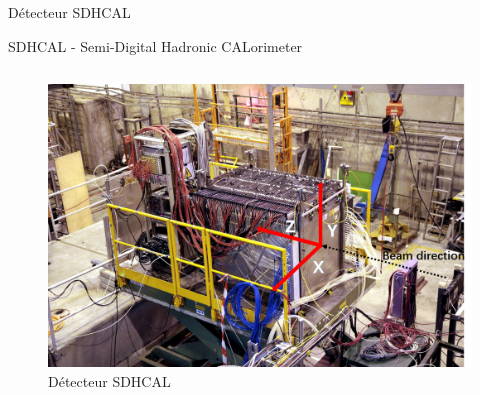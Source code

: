 \documentclass[9pt]{beamer}
\begin{document}
\begin{frame}{Détecteur SDHCAL}
\begin{block}{SDHCAL - Semi-Digital Hadronic CALorimeter}
\begin{columns}
            \begin{column}{0.45\textwidth}
                \begin{figure}
                    \center
                    \includegraphics[width=\textwidth]{../img/SDHCAL.png}
                    \caption{Détecteur SDHCAL}
                    \label{detector}
                \end{figure}
            \end{column}
        \end{columns}
    \end{block}
\end{frame}

\end{document}
